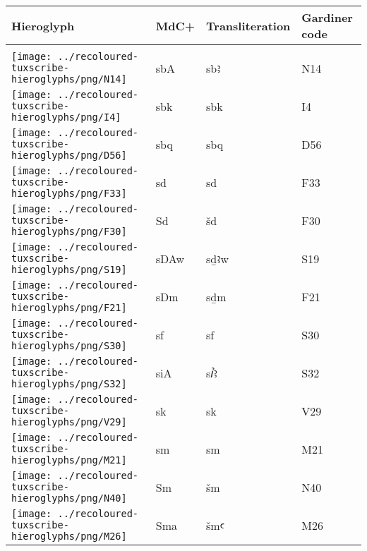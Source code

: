 \begin{center}
	\begin{tabularx}{\linewidth}{YYYY}
		Hieroglyph & MdC+ & Transliteration & Gardiner code\\
		\hline\\
		\texttt{[image: ../recoloured-tuxscribe-hieroglyphs/png/N14]} & sbA & sbꜣ & N14 \\ 
		\texttt{[image: ../recoloured-tuxscribe-hieroglyphs/png/I4]} & sbk & sbk & I4 \\ 
		\texttt{[image: ../recoloured-tuxscribe-hieroglyphs/png/D56]} & sbq & sbq & D56 \\ 
		\texttt{[image: ../recoloured-tuxscribe-hieroglyphs/png/F33]} & sd & sd & F33 \\ 
		\texttt{[image: ../recoloured-tuxscribe-hieroglyphs/png/F30]} & Sd & šd & F30 \\ 
		\texttt{[image: ../recoloured-tuxscribe-hieroglyphs/png/S19]} & sDAw & sḏꜣw & S19 \\ 
		\texttt{[image: ../recoloured-tuxscribe-hieroglyphs/png/F21]} & sDm & sḏm & F21 \\ 
		\texttt{[image: ../recoloured-tuxscribe-hieroglyphs/png/S30]} & sf & sf & S30 \\ 
		\texttt{[image: ../recoloured-tuxscribe-hieroglyphs/png/S32]} & siA & sꞽꜣ & S32 \\ 
		\texttt{[image: ../recoloured-tuxscribe-hieroglyphs/png/V29]} & sk & sk & V29 \\ 
		\texttt{[image: ../recoloured-tuxscribe-hieroglyphs/png/M21]} & sm & sm & M21 \\ 
		\texttt{[image: ../recoloured-tuxscribe-hieroglyphs/png/N40]} & Sm & šm & N40 \\ 
		\texttt{[image: ../recoloured-tuxscribe-hieroglyphs/png/M26]} & Sma & šmꜥ & M26 \\ 
	\end{tabularx}
\end{center}


